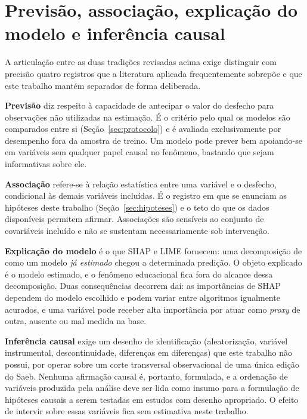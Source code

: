 \section{Previsão, associação, explicação do modelo e inferência causal}
\label{sec:registros-inferenciais}

A articulação entre as duas tradições revisadas acima exige distinguir com
precisão quatro registros que a literatura aplicada frequentemente sobrepõe
e que este trabalho mantém separados de forma deliberada.

\textbf{Previsão} diz respeito à capacidade de antecipar o valor do
desfecho para observações não utilizadas na estimação. É o critério pelo
qual os modelos são comparados entre si (Seção~\ref{sec:protocolo}) e é
avaliada exclusivamente por desempenho fora da amostra de treino. Um modelo
pode prever bem apoiando-se em variáveis sem qualquer papel causal no
fenômeno, bastando que sejam informativas sobre ele.

\textbf{Associação} refere-se à relação estatística entre uma variável e o
desfecho, condicional às demais variáveis incluídas. É o registro em que se
enunciam as hipóteses deste trabalho (Seção~\ref{sec:hipoteses}) e o teto do
que os dados disponíveis permitem afirmar. Associações são sensíveis ao
conjunto de covariáveis incluído e não se sustentam necessariamente sob
intervenção.

\textbf{Explicação do modelo} é o que SHAP e LIME fornecem: uma decomposição
de como um modelo \emph{já estimado} chegou a determinada predição. O objeto
explicado é o modelo estimado, e o fenômeno educacional fica fora do
alcance dessa decomposição. Duas consequências
decorrem daí: as importâncias de SHAP dependem do modelo escolhido e podem
variar entre algoritmos igualmente acurados, e uma variável pode receber
alta importância por atuar como \textit{proxy} de outra, ausente ou mal
medida na base.

\textbf{Inferência causal} exige um desenho de identificação
(aleatorização, variável instrumental, descontinuidade, diferenças em
diferenças) que este trabalho não possui, por operar sobre um corte
transversal observacional de uma única edição do Saeb. Nenhuma afirmação
causal é, portanto, formulada, e a ordenação de variáveis produzida pela
análise deve ser lida como insumo para a formulação de hipóteses causais a
serem testadas em estudos com desenho apropriado. O efeito de intervir
sobre essas variáveis fica sem estimativa neste trabalho.

